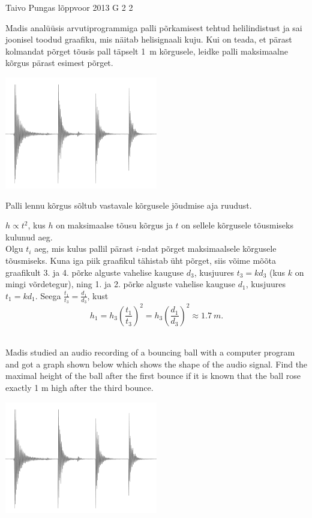 {Taivo Pungas} %
{lõppvoor} %
{2013} %
{G 2} %
{2} %
{
\ifStatement
Madis analüüsis arvutiprogrammiga palli põrkamisest tehtud helilindistust
ja sai joonisel toodud graafiku, mis näitab helisignaali kuju.
Kui on teada, et pärast kolmandat põrget tõusis pall täpselt \SI{1}{m} kõrgusele,
leidke palli maksimaalne kõrgus pärast esimest põrget.
\begin{center}
\includegraphics[width=0.5\textwidth]{2013-v3g-02-pall}%
\end{center}
\fi


\ifHint
Palli lennu kõrgus sõltub vastavale kõrgusele jõudmise aja ruudust.
\fi


\ifSolution
$h \propto t^{2}$, kus $h$ on maksimaalse tõusu kõrgus ja $t$ on sellele kõrgusele tõusmiseks kulunud aeg.\\
Olgu $t_{i}$ aeg, mis kulus pallil pärast $i$-ndat põrget maksimaalsele kõrgusele tõusmiseks. Kuna iga piik graafikul tähistab üht põrget, siis võime mõõta graafikult 3. ja 4. põrke alguste vahelise kauguse $d_{3}$, kusjuures $t_{3}=kd_{3}$ (kus $k$ on mingi võrdetegur), ning 1. ja 2. põrke alguste vahelise kauguse $d_{1}$, kusjuures $t_{1}=kd_{1}$. Seega 
$\frac{t_{1}}{t_{3}}=\frac{d_{1}}{d_{3}}$, kust
$$h_{1}=h_{3}\left(\frac{t_{1}}{t_{3}}\right)^{2}=h_{3}\left(\frac{d_{1}}{d_{3}}\right)^{2} \approx \SI{1,7}{m}.$$\\
\fi


\ifEngStatement
Madis studied an audio recording of a bouncing ball with a computer program and got a graph shown below which shows the shape of the audio signal. Find the maximal height of the ball after the first bounce if it is known that the ball rose exactly 1 m high after the third bounce.
\begin{center}
\includegraphics[width=0.5\textwidth]{2013-v3g-02-pall}%
\end{center}
\fi


}
